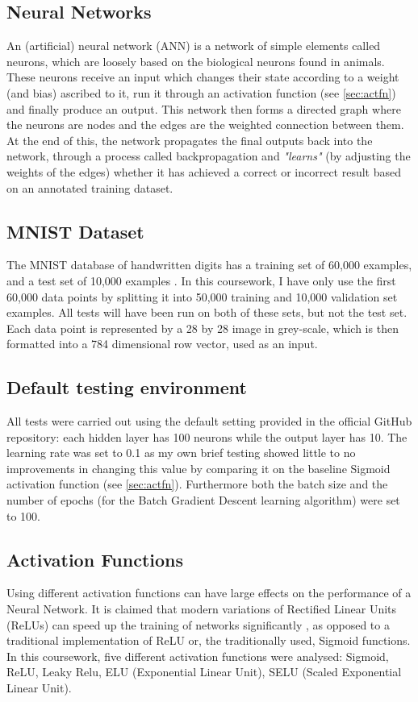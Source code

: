 \documentclass{article}
\begin{document}
\subsection{Neural Networks}\label{sec:subintro}
An (artificial) neural network (ANN) is a network of simple elements called neurons, which are loosely based on the biological neurons found in animals. These neurons receive an input which changes their state according to a weight (and bias) ascribed to it, run it through an activation function (see \ref{sec:actfn}) and finally produce an output. This network then forms a directed graph where the neurons are nodes and the edges are the weighted connection between them. At the end of this, the network propagates the final outputs back into the network, through a process called backpropagation and \textit{"learns"} (by adjusting the weights of the edges) whether it has achieved a correct or incorrect result based on an annotated training dataset. \citep{rädle2010neuronale}

\subsection{MNIST Dataset}\label{sec:dataset}
The MNIST database of handwritten digits has a training set of 60,000 examples, and a test set of 10,000 examples \citep{lecun_1998}. In this coursework, I have only use the first 60,000 data points by splitting it into 50,000 training and 10,000 validation set examples. All tests will have been run on both of these sets, but not the test set. Each data point is represented by a 28 by 28 image in grey-scale, which is then formatted into a 784 dimensional row vector, used as an input.

\subsection{Default testing environment}\label{sec:testing_env}
All tests were carried out using the default setting provided in the official GitHub repository: each hidden layer has 100 neurons while the output layer has 10. The learning rate was set to 0.1 as my own brief testing showed little to no improvements in changing this value by comparing it on the baseline Sigmoid activation function (see \ref{sec:actfn}). Furthermore both the batch size and the number of epochs (for the Batch Gradient Descent learning algorithm) were set to 100.

\subsection{Activation Functions}\label{sec:activation_funct}
Using different activation functions can have large effects on the performance of a Neural Network. It is claimed that modern variations of Rectified Linear Units (ReLUs) can speed up the training of networks significantly \citep{elu} \citep{selu}, as opposed to a traditional implementation of ReLU or, the traditionally used, Sigmoid functions. In this coursework, five different activation functions were analysed: Sigmoid, ReLU, Leaky Relu, ELU (Exponential Linear Unit), SELU (Scaled Exponential Linear Unit).
\end{document}
